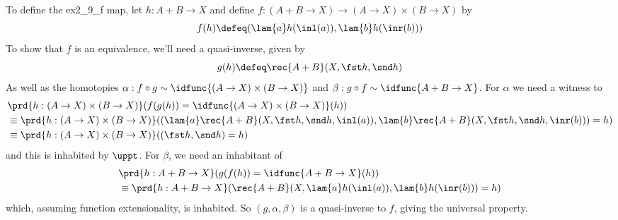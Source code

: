  \soln
To define the ex2\_9\_f map, let $h : A+B \to X$ and define $f : (A+B\to X) \to
(A\to X) \times (B \to X)$ by
\[
  f(h) \defeq (\lam{a}h(\inl(a)), \lam{b}h(\inr(b)))
\]
To show that $f$ is an equivalence, we'll need a quasi-inverse, given by
\[
 g(h) \defeq \rec{A+B}(X, \fst h, \snd h)
\]
As well as the homotopies $\alpha : f\circ g \sim \idfunc{(A\to X)\times(B \to
X)}$ and $\beta : g \circ f \sim \idfunc{A+B\to X}$.  For $\alpha$ we need a
witness to
\begin{align*}
  &\prd{h:(A\to X) \times (B\to X)} (f(g(h)) 
  = \idfunc{(A\to X) \times (B\to X)}(h))
  \\&\equiv
  \prd{h:(A\to X) \times (B\to X)} (
  (\lam{a}\rec{A+B}(X, \fst h, \snd h, \inl(a)),
   \lam{b}\rec{A+B}(X, \fst h, \snd h, \inr(b)))
  = h)
  \\&\equiv
  \prd{h:(A\to X) \times (B\to X)} ((\fst h, \snd h) = h)
\end{align*}
and this is inhabited by $\uppt$.  For $\beta$, we need an inhabitant of
\begin{align*}
  &\prd{h:A+B\to X} (g(f(h)) = \idfunc{A+B\to X}(h))
  \\&\equiv
  \prd{h:A+B\to X} (
  \rec{A+B}(X, \lam{a}h(\inl(a)), \lam{b}h(\inr(b)))
  = h)
\end{align*}
which, assuming function extensionality, is inhabited.  So $(g,
\alpha, \beta)$ is a quasi-inverse to $f$, giving the universal property.
